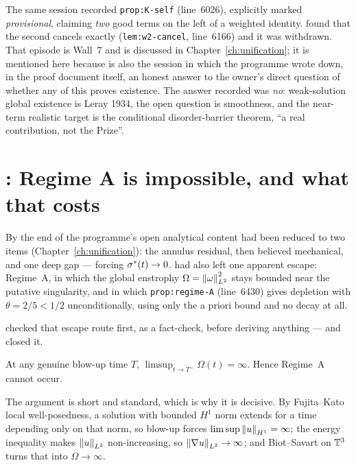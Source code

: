 The same session recorded \texttt{prop:K-self} (line~6026), explicitly marked
\emph{provisional}, claiming \emph{two} good terms on the left of a weighted
identity.  found that the second cancels exactly
(\texttt{lem:w2-cancel}, line~6166) and it was withdrawn. That episode is
Wall~7 and is discussed in Chapter~\ref{ch:unification}; it is mentioned here
because  is also the session in which the programme wrote down, in the
proof document itself, an honest answer to the owner's direct question of
whether any of this proves existence. The answer recorded was \emph{no}:
weak-solution global existence is Leray 1934, the open question is smoothness,
and the near-term realistic target is the conditional disorder-barrier
theorem, ``a real contribution, not the Prize''.

\section{\texorpdfstring{: Regime A is impossible, and what that costs}{S38: Regime A is impossible, and what that costs}}
\label{sec:regime-a}

By the end of  the programme's open analytical content had been reduced
to two items (Chapter~\ref{ch:unification}): the annulus residual, then
believed mechanical, and one deep gap --- forcing \(\sigma^{*}(t)\to0\). 
had also left one apparent escape: Regime~A, in which the global enstrophy
\(\Omega=\left\|\omega\right\|_{L^2}^2\) stays bounded near the putative singularity,
and in which \texttt{prop:regime-A} (line~6430) gives depletion with
\(\theta=2/5<1/2\) unconditionally, using only the a priori bound and no decay
at all.

 checked that escape route first, as a fact-check, before deriving
anything --- and closed it.

\begin{statement}
\label{st:regime-a-impossible}
\IMPOSSIBLE{} At any genuine blow-up time \(T\),
\(\limsup_{t\to T^-}\Omega(t)=\infty\). Hence Regime~A cannot occur.
\end{statement}

The argument is short and standard, which is why it is decisive. By
Fujita--Kato local well-posedness, a solution with bounded \(H^1\) norm extends
for a time depending only on that norm, so blow-up forces
\(\limsup\left\|u\right\|_{H^1}=\infty\); the energy inequality makes
\(\left\|u\right\|_{L^2}\) non-increasing, so \(\left\|\nabla u\right\|_{L^2}\to\infty\); and
Biot--Savart on \(\mathbb{T}^3\) turns that into \(\Omega\to\infty\).

